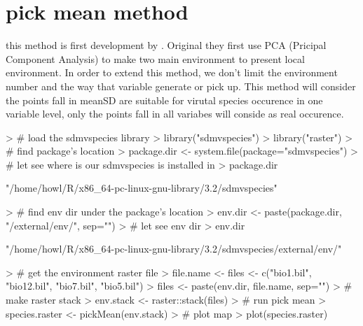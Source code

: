 \documentclass{report}
\begin{document}
\section*{pick mean method}
this method is first development by \citet{jimenez-valverde_threshold_2007}. Original they first use PCA (Pricipal Component Analysis) to make two main environment to present
local environment. In order to extend this method, we don't limit the environment number and the way that variable generate or pick up.
This method will consider the points fall in mean\textpm SD are suitable for virutal species occurence in one variable level, only the points fall in all variabes will conside as real occurence.
\begin{Schunk}
\begin{Sinput}
> # load the sdmvspecies library
> library("sdmvspecies")
> library("raster")
> # find package's location
> package.dir <- system.file(package="sdmvspecies")
> # let see where is our sdmvspecies is installed in
> package.dir
\end{Sinput}
\begin{Soutput}
[1] "/home/howl/R/x86_64-pc-linux-gnu-library/3.2/sdmvspecies"
\end{Soutput}
\begin{Sinput}
> # find env dir under the package's location
> env.dir <- paste(package.dir, "/external/env/", sep="")
> # let see env dir
> env.dir
\end{Sinput}
\begin{Soutput}
[1] "/home/howl/R/x86_64-pc-linux-gnu-library/3.2/sdmvspecies/external/env/"
\end{Soutput}
\begin{Sinput}
> # get the environment raster file
> file.name <- files <- c("bio1.bil", "bio12.bil", "bio7.bil", "bio5.bil")
> files <- paste(env.dir, file.name, sep="")
> # make raster stack
> env.stack <- raster::stack(files)
> # run pick mean
> species.raster <- pickMean(env.stack)
> # plot map
> plot(species.raster)
\end{Sinput}
\end{Schunk}
\end{document}
